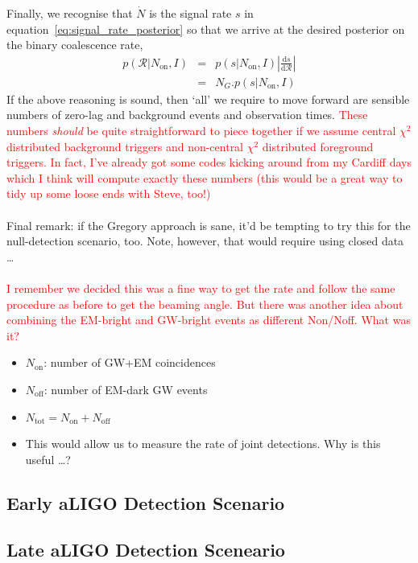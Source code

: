 \documentclass[nofootinbib]{revtex4}
\newcommand{\cbcrate}{{{\mathcal R}}}
\newcommand{\diff}{{\mathrm d}}
\begin{document}
Finally, we recognise that $\dot{N}$ is the signal rate $s$ in
equation~\ref{eq:signal_rate_posterior} so that we arrive at the desired
posterior on the binary coalescence rate, 
%
\begin{eqnarray}
p(\cbcrate|N_{\textrm{on}},I) & = & p(s|N_{\textrm{on}},I) \left|\frac{\diff
s}{\diff \cbcrate}\right| \\
& = & N_G . p(s|N_{\textrm{on}},I)
\end{eqnarray}
%
If the above reasoning is sound, then `all' we require to move forward are
sensible numbers of zero-lag and background events and observation times.
\textcolor{red}{These numbers \emph{should} be quite straightforward to piece
together if we assume central $\chi^2$ distributed background triggers and
non-central $\chi^2$ distributed foreground triggers.  In fact, I've already got
some codes kicking around from my Cardiff days which I think will compute
exactly these numbers (this would be a great way to tidy up some loose ends with
Steve, too!)}
\\ \\
Final remark: if the Gregory approach is sane, it'd be tempting to try this for
the null-detection scenario, too.  Note, however, that would require using
closed data \dots
\\ \\
\textcolor{red}{I remember we decided this was a fine way to get the rate and
follow the same procedure as before to get the beaming angle.  But there was
another idea about combining the EM-bright and GW-bright events as different
Non/Noff.  What was it?}

\begin{itemize}
\item $N_{\mathrm{on}}$: number of GW+EM coincidences
\item $N_{\mathrm{off}}$: number of EM-dark GW events
\item $N_{\mathrm{tot}} = N_{\mathrm{on}} + N_{\mathrm{off}}$
\item This would allow us to measure the rate of joint detections.  Why is this
useful \dots ? 
\end{itemize}

\subsection{Early aLIGO Detection Scenario}
\subsection{Late aLIGO Detection Sceneario}
\end{document}
